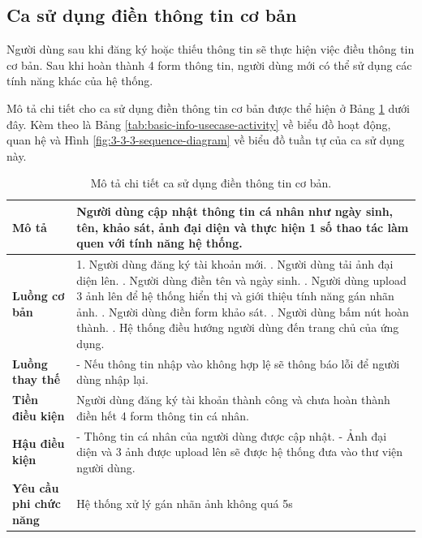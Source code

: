 \subsection{Ca sử dụng điền thông tin cơ bản}

Người dùng sau khi đăng ký hoặc thiếu thông tin sẽ thực hiện việc điều thông tin cơ bản. Sau khi hoàn thành 4 form thông tin, người dùng mới có thể sử dụng các tính năng khác của hệ thống.

Mô tả chi tiết cho ca sử dụng điền thông tin cơ bản được thể hiện ở Bảng \ref{tab:basic-info-usecase} dưới đây. Kèm theo là Bảng \ref{tab:basic-info-usecase-activity} về biểu đồ hoạt động, quan hệ và Hình \ref{fig:3-3-3-sequence-diagram} về biểu đồ tuần tự của ca sử dụng này. 

\noindent 
\begin{table}[H]
\centering
\begin{tabularx}{\linewidth}{| l | X |} 
\hline 
\textbf{Mô tả} & Người dùng cập nhật thông tin cá nhân như ngày sinh, tên, khảo sát, ảnh đại diện và thực hiện 1 số thao tác làm quen với tính năng hệ thống. \\ 
\hline 
\textbf{Luồng cơ bản} & 1. Người dùng đăng ký tài khoản mới. \newline
                       2. Người dùng tải ảnh đại diện lên. \newline
                       3. Người dùng điền tên và ngày sinh. \newline
                       4. Người dùng upload 3 ảnh lên để hệ thống hiển thị và giới thiệu tính năng gán nhãn ảnh. \newline
                       5. Người dùng điền form khảo sát. \newline
                       6. Người dùng bấm nút hoàn thành. \newline
                       7. Hệ thống điều hướng người dùng đến trang chủ của ứng dụng. \\
\hline 
\textbf{Luồng thay thế} &
                       - Nếu thông tin nhập vào không hợp lệ sẽ thông báo lỗi để người dùng nhập lại. \\ 
\hline 
\textbf{Tiền điều kiện} & Người dùng đăng ký tài khoản thành công và chưa hoàn thành điền hết 4 form thông tin cá nhân. \\
\hline 
\textbf{Hậu điều kiện} & - Thông tin cá nhân của người dùng được cập nhật. \newline
                       - Ảnh đại diện và 3 ảnh được upload lên sẽ được hệ thống đưa vào thư viện người dùng. \\ 
\hline 
\textbf{Yêu cầu phi chức năng} & Hệ thống xử lý gán nhãn ảnh không quá 5s \\
\hline 
\end{tabularx}
\caption{Mô tả chi tiết ca sử dụng điền thông tin cơ bản.}
\label{tab:basic-info-usecase}
\end{table}
\vspace{0.8cm}


